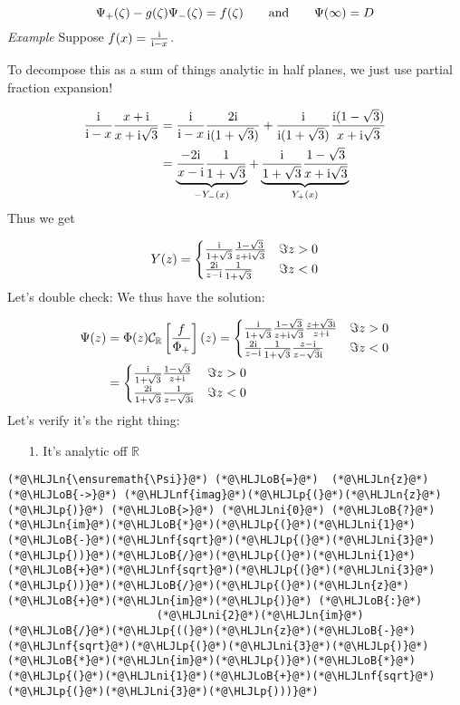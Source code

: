 \documentclass[12pt,landscape]{article}
\newcommand{\HLJLn}[1]{#1}
\newcommand{\HLJLnf}[1]{\textcolor[RGB]{66,102,213}{#1}}
\newcommand{\HLJLni}[1]{\textcolor[RGB]{59,151,46}{#1}}
\newcommand{\HLJLoB}[1]{\textcolor[RGB]{102,102,102}{\textbf{#1}}}
\newcommand{\HLJLp}[1]{#1}
\def\qqand{\qquad\hbox{and}\qquad}
\def\I{ {\rm i} }
\def\R{ {\mathbb R} }
\def\CC{ {\cal C} }
\def\br[#1]{\left[{#1}\right]}
\begin{document}
{\[
\Psi_+(\zeta) - g(\zeta)\Psi_-(\zeta) = f(\zeta) \qqand \Psi(\infty) =D
\]
\emph{Example} Suppose $f(x) = {\I \over \I-x}$.

To decompose this as a sum of things analytic in half planes, we just use partial fraction expansion!


\begin{align*}
{\I \over \I-x} {x + \I \over x+ \I \sqrt{3}} &= {\I \over \I-x}{2\I \over \I(1+ \sqrt{3})}  +{\I \over \I(1+\sqrt 3)} {\I(1-\sqrt 3) \over x+ \I \sqrt{3}}\\
&= \underbrace{{-2 \I \over x-\I}{1 \over 1+ \sqrt{3}}}_{-Y_-(x)}  + \underbrace{{\I \over 1+\sqrt 3} {1-\sqrt 3 \over x+ \I \sqrt{3}}}_{Y_+(x)}
\end{align*}
Thus we get

\[
Y(z) = \begin{cases}
{\I \over 1+\sqrt 3} {1-\sqrt 3 \over z+ \I \sqrt{3}} & \Im z > 0 \\
{2 \I \over z-\I}{1 \over 1+ \sqrt{3}} & \Im z < 0
\end{cases}
\]
Let's double check: We thus have the solution:


\begin{align*}
\Psi(z)  &= \Phi(z) \CC_\R\br[{f \over \Phi_+}](z) = \begin{cases}
{\I \over 1+\sqrt 3} {1-\sqrt 3 \over z+ \I \sqrt{3}} {z+\sqrt{3}\I \over z+\I} & \Im z > 0 \\
{2 \I \over z-\I}{1 \over 1+ \sqrt{3}} {z-\I \over z-\sqrt{3}\I} & \Im z < 0
\end{cases} \\
    &= \begin{cases}
{\I \over 1+\sqrt 3} {1-\sqrt 3 \over z+\I} & \Im z > 0 \\
{2 \I  \over 1+ \sqrt{3}} {1 \over z-\sqrt{3}\I} & \Im z < 0
\end{cases}
\end{align*}
Let's verify it's the right thing:

\begin{itemize}
\item[1. ] It's analytic off $\R$

\end{itemize}

\begin{lstlisting}
(*@\HLJLn{\ensuremath{\Psi}}@*) (*@\HLJLoB{=}@*)  (*@\HLJLn{z}@*) (*@\HLJLoB{->}@*) (*@\HLJLnf{imag}@*)(*@\HLJLp{(}@*)(*@\HLJLn{z}@*)(*@\HLJLp{)}@*) (*@\HLJLoB{>}@*) (*@\HLJLni{0}@*) (*@\HLJLoB{?}@*) (*@\HLJLn{im}@*)(*@\HLJLoB{*}@*)(*@\HLJLp{(}@*)(*@\HLJLni{1}@*)(*@\HLJLoB{-}@*)(*@\HLJLnf{sqrt}@*)(*@\HLJLp{(}@*)(*@\HLJLni{3}@*)(*@\HLJLp{))}@*)(*@\HLJLoB{/}@*)(*@\HLJLp{(}@*)(*@\HLJLni{1}@*)(*@\HLJLoB{+}@*)(*@\HLJLnf{sqrt}@*)(*@\HLJLp{(}@*)(*@\HLJLni{3}@*)(*@\HLJLp{))}@*)(*@\HLJLoB{/}@*)(*@\HLJLp{(}@*)(*@\HLJLn{z}@*)(*@\HLJLoB{+}@*)(*@\HLJLn{im}@*)(*@\HLJLp{)}@*) (*@\HLJLoB{:}@*)
                       (*@\HLJLni{2}@*)(*@\HLJLn{im}@*)(*@\HLJLoB{/}@*)(*@\HLJLp{((}@*)(*@\HLJLn{z}@*)(*@\HLJLoB{-}@*)(*@\HLJLnf{sqrt}@*)(*@\HLJLp{(}@*)(*@\HLJLni{3}@*)(*@\HLJLp{)}@*)(*@\HLJLoB{*}@*)(*@\HLJLn{im}@*)(*@\HLJLp{)}@*)(*@\HLJLoB{*}@*)(*@\HLJLp{(}@*)(*@\HLJLni{1}@*)(*@\HLJLoB{+}@*)(*@\HLJLnf{sqrt}@*)(*@\HLJLp{(}@*)(*@\HLJLni{3}@*)(*@\HLJLp{)))}@*)


\end{lstlisting}}
\end{document}
